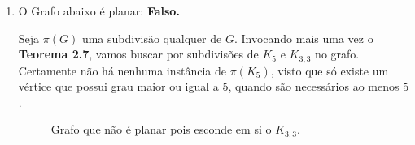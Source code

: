 \documentclass{homework}
\newtheorem*{supposition}{Suposição}
\begin{document}
\begin{enumerate}[label=\textbf{\arabic*)}]
	Dados dois grafos, $G$ e $H$, dizemos que $G \cong H$ se $\exists f : V(G) \to V(H)$ tal que
		\begin{align}
			(w, v) \in E(G) \iff (f(w), f(v)) \in E(H)
		\end{align}
	Satisfeito, $f$ é dito um isomorfismo entre $G$ e $H$. Seja $w \in V(G)$ um vértice qualquer onde $f(w) \in V(H)$,
	\begin{supposition}
		$\text{grau}(w) = \text{grau}(f(w))$
	\end{supposition}
	\begin{proof}
		\begin{align}
		\text{Seja } \mathbb{I}_{\Omega}\{\omega\} &\triangleq \begin{cases}
		1 \text{ se } \omega \in \Omega\\
		0 \text{ caso contrário}
		\end{cases} \nonumber \\
		~ \nonumber \\
		\text{grau}(w) &= \sum_{v \in V(G)} \mathbb{I}_{E(G)}\{(w, v)\}\\
					   &= \sum_{f(v) \in V(H)} \mathbb{I}_{E(H)}\{(f(w), f(v))\}\\
					   &= \text{grau}(f(w)) & \nonumber
		\end{align}
	\end{proof}

	De $(2)$ para $(3)$ utilizamos a relação $(1)$, extraída da definição de isomorfismo em grafos presente no Capítulo 2 do livro\cite{jayme:18}. Utilizamos também o fato de que $V(H) \cong {f(v) : v \in V(G)}$, da definição de domínio do isomorfismo. \par
	
	\item O Grafo abaixo é planar: \textbf{Falso.} \par
	
	Seja $\pi(G)$ uma subdivisão qualquer de $G$. Invocando mais uma vez o \textbf{Teorema 2.7}\cite{jayme:18}, vamos buscar por subdivisões de $K_5$ e $K_{3, 3}$ no grafo. Certamente não há nenhuma instância de $\pi(K_5)$, visto que só existe um vértice que possui grau maior ou igual a $5$, quando são necessários ao menos $5$.
	
	\begin{figure}[H]
		\centering
		
		\caption{Grafo que não é planar pois esconde em si o $K_{3,3}$.}
		\label{fig:1.5.1}
	\end{figure}
	

\end{enumerate}
\end{document}
